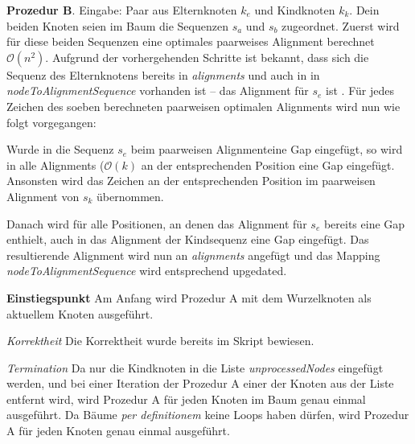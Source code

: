 \documentclass[a4paper,10pt,oneside,reqno]{scrartcl}
\begin{document}
\textbf{Prozedur B}. Eingabe: Paar aus Elternknoten $k_e$ und Kindknoten $k_k$. Dein beiden Knoten seien im Baum die Sequenzen $s_a$ und $s_b$ zugeordnet. Zuerst wird für diese beiden Sequenzen eine optimales paarweises Alignment berechnet $\mathcal{O}(n^2)$. Aufgrund der vorhergehenden Schritte ist bekannt, dass sich die Sequenz des Elternknotens bereits in \textit{alignments} und auch in in \textit{nodeToAlignmentSequence} vorhanden ist -- das Alignment für $s_e$ ist  	. Für jedes Zeichen des soeben berechneten paarweisen optimalen Alignments wird nun wie folgt vorgegangen:

Wurde in die Sequenz $s_e$ beim paarweisen Alignmenteine Gap eingefügt, so wird in alle Alignments (\textrightarrow $\mathcal{O}(k)$ an der entsprechenden Position eine Gap eingefügt. Ansonsten wird das Zeichen an der entsprechenden Position im paarweisen Alignment von $s_k$ übernommen.

Danach wird für alle Positionen, an denen das Alignment für $s_e$ bereits eine Gap enthielt, auch in das Alignment der Kindsequenz eine Gap eingefügt. Das resultierende Alignment wird nun an \textit{alignments} angefügt und das Mapping \textit{nodeToAlignmentSequence} wird entsprechend upgedated.

\textbf{Einstiegspunkt} Am Anfang wird Prozedur A mit dem Wurzelknoten als aktuellem Knoten ausgeführt.

\textit{Korrektheit} Die Korrektheit wurde bereits im Skript bewiesen.

\textit{Termination} Da nur die Kindknoten in die Liste \textit{unprocessedNodes} eingefügt werden, und bei einer Iteration der Prozedur A einer der Knoten aus der Liste entfernt wird, wird Prozedur A für jeden Knoten im Baum genau einmal ausgeführt. Da Bäume \textit{per definitionem} keine Loops haben dürfen, wird Prozedur A für jeden Knoten genau einmal ausgeführt.
\end{document}
